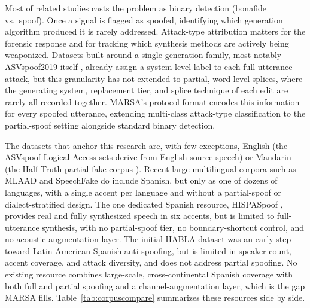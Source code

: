 \documentclass[11pt]{article}
\begin{document}
Most of related studies casts the problem as binary detection (bonafide vs.\ spoof). Once a signal is flagged as spoofed, identifying which generation algorithm produced it is rarely addressed. Attack-type attribution matters for the forensic response and for tracking which synthesis methods are actively being weaponized. Datasets built around a single generation family, most notably ASVspoof2019 itself \citep{asvspoof2019}, already assign a system-level label to each full-utterance attack, but this granularity has not extended to partial, word-level splices, where the generating system, replacement tier, and splice technique of each edit are rarely all recorded together. MARSA's protocol format encodes this information for every spoofed utterance, extending multi-class attack-type classification to the partial-spoof setting alongside standard binary detection.


The datasets that anchor this research are, with few exceptions, English (the ASVspoof Logical Access sets derive from English source speech) or Mandarin (the Half-Truth partial-fake corpus \citep{yi2021had}). Recent large multilingual corpora such as MLAAD \citep{mlaad} and SpeechFake \citep{speechfake} do include Spanish, but only as one of dozens of languages, with a single accent per language and without a partial-spoof or dialect-stratified design. The one dedicated Spanish resource, HISPASpoof \citep{hispaspoof}, provides real and fully synthesized speech in six accents, but is limited to full-utterance synthesis, with no partial-spoof tier, no boundary-shortcut control, and no acoustic-augmentation layer. The initial HABLA dataset \citep{habla} was an early step toward Latin American Spanish anti-spoofing, but is limited in speaker count, accent coverage, and attack diversity, and does not address partial spoofing. No existing resource combines large-scale, cross-continental Spanish coverage with both full and partial spoofing and a channel-augmentation layer, which is the gap MARSA fills. Table~\ref{tab:corpuscompare} summarizes these resources side by side.
\end{document}
